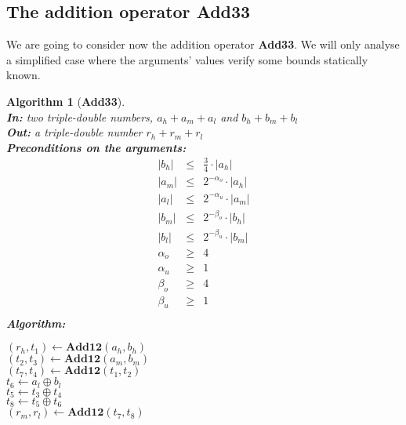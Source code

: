 \documentclass[a4paper,10pt,twoside]{article}
\newtheorem{algorithm}[theorem]{Algorithm}
\newcommand{\hi}{\ensuremath{\mathit{h}}}
\newcommand{\mi}{\ensuremath{\mathit{m}}}
\newcommand{\lo}{\ensuremath{\mathit{l}}}
\newcommand{\AddTT}{{\bf Add33}}
\newcommand{\mAdd}{\ensuremath{\mathbf{Add12}}}
\begin{document}
\subsection{The addition operator \AddTT}
We are going to consider now the addition operator \AddTT. We will only
analyse a simplified case where the arguments' values verify some bounds
statically known.
\begin{algorithm}[\AddTT] \label{addTTref} ~ \\
{\bf In:} two triple-double numbers, $a_\hi + a_\mi + a_\lo$ and $b_\hi + b_\mi + b_\lo$ \\
{\bf Out:} a triple-double number $r_\hi + r_\mi + r_\lo$ \\
{\bf Preconditions on the arguments:}
\begin{eqnarray*}
\left \vert b_\hi \right \vert & \leq & \frac{3}{4} \cdot \left \vert a_\hi \right \vert \\
\left \vert a_\mi \right \vert & \leq & 2^{-\alpha_o} \cdot \left \vert a_\hi \right \vert \\
\left \vert a_\lo \right \vert & \leq & 2^{-\alpha_u} \cdot \left \vert a_\mi \right \vert \\
\left \vert b_\mi \right \vert & \leq & 2^{-\beta_o} \cdot \left \vert b_\hi \right \vert \\
\left \vert b_\lo \right \vert & \leq & 2^{-\beta_u} \cdot \left \vert b_\mi \right \vert \\
\alpha_o & \geq & 4 \\
\alpha_u & \geq & 1 \\
\beta_o & \geq & 4 \\
\beta_u & \geq & 1 \\
\end{eqnarray*}
{\bf Algorithm:} \\
\begin{center}
\begin{minipage}[b]{50mm}
$\left(r_\hi, t_1 \right) \gets \mAdd\left( a_\hi, b_\hi \right)$ \\
$\left(t_2, t_3 \right) \gets \mAdd\left( a_\mi, b_\mi \right)$ \\
$\left(t_7, t_4 \right) \gets \mAdd\left( t_1, t_2 \right)$ \\
$t_6 \gets a_\lo \oplus b_\lo$ \\
$t_5 \gets t_3 \oplus t_4$ \\
$t_8 \gets t_5 \oplus t_6$ \\
$\left( r_\mi, r_\lo \right) \gets \mAdd\left( t_7, t_8 \right)$
\end{minipage}
\end{center}
\end{algorithm}
\end{document}
